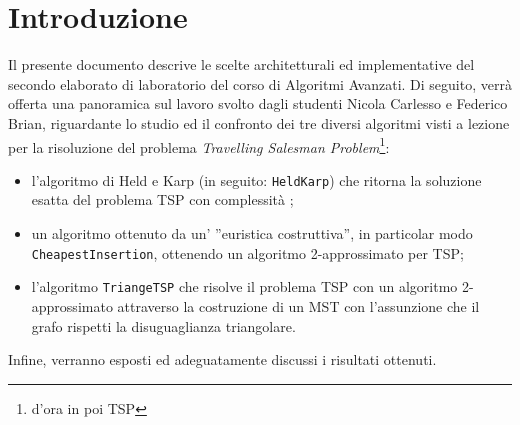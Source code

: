 \section{Introduzione}
Il presente documento descrive le scelte architetturali ed implementative del secondo elaborato di laboratorio del corso di Algoritmi Avanzati. Di seguito, verrà offerta una panoramica sul lavoro svolto dagli studenti Nicola Carlesso e Federico Brian, riguardante lo studio ed il confronto dei tre diversi algoritmi visti a lezione per la risoluzione del problema \emph{Travelling Salesman Problem}\footnote{d'ora in poi TSP}:
\begin{itemize}
	\item l'algoritmo di Held e Karp (in seguito: \texttt{HeldKarp}) che ritorna la soluzione esatta del problema TSP con complessità ;
	\item un algoritmo ottenuto da un' ''euristica costruttiva'', in particolar modo \texttt{CheapestInsertion}, ottenendo un algoritmo 2-approssimato per TSP;
	\item l'algoritmo \texttt{TriangeTSP} che risolve il problema TSP con un algoritmo 2-approssimato attraverso la costruzione di un MST con l'assunzione che il grafo rispetti la disuguaglianza triangolare.
\end{itemize}
 Infine, verranno esposti ed adeguatamente discussi i risultati ottenuti.
 \newpage
